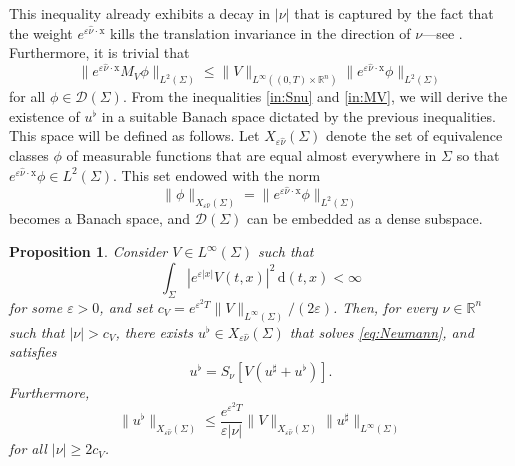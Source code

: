 \documentclass[10pt,a4paper]{amsart}
\newtheorem{proposition}{Proposition}[section]
\theoremstyle{remark}
\theoremstyle{definition}
\newcommand{\R}{\mathbb{R}}
\newcommand{\dd}{\mathrm{d}}
\newcommand{\tm}{\mathrm{t}}
\newcommand{\x}{\mathrm{x}}
\newcommand{\marnote}[1]{\marginpar{\footnotesize #1}} %
\begin{document}
This inequality already exhibits a decay in $|\nu|$ that is captured by the fact that the 
weight $e^{\varepsilon \hat{\nu} \cdot \x}$ kills the translation invariance in the direction 
of $\nu$---see .
Furthermore, it is trivial that
\begin{equation}
\label{in:MV}
\| e^{\varepsilon \hat{\nu} \cdot \x} M_V \phi \|_{L^2(\Sigma)} \leq \| V \|_{L^\infty ((0, T) \times \R^n)} \| e^{\varepsilon \hat{\nu} \cdot \x} \phi \|_{L^2(\Sigma)}
\end{equation}
for all $\phi \in \mathcal{D}(\Sigma)$.
From the inequalities \eqref{in:Snu} and \eqref{in:MV}, we will derive the existence of 
$u^\flat$ in a suitable Banach space dictated by the previous inequalities. This space will be defined as follows. Let $X_{\varepsilon\hat{\nu}}(\Sigma)$ denote 
the set of equivalence classes $\phi$ of measurable functions 
that are equal almost everywhere in $\Sigma$ so that 
$e^{\varepsilon \hat{\nu} \cdot \x} \phi \in L^2(\Sigma)$.
This set endowed with the norm
\[ \| \phi \|_{X_{\varepsilon \hat{\nu}}(\Sigma)} = \| e^{\varepsilon \hat{\nu} \cdot \x} \phi \|_{L^2(\Sigma)} \]
becomes a Banach space, and $\mathcal{D}(\Sigma)$ can be embedded as a dense 
subspace.

\begin{proposition}\label{Prop CGO1}\sl
Consider $V \in L^\infty (\Sigma) $ such that
\begin{equation*}
\int_{\Sigma} | e^{\varepsilon |x|} V(t, x) |^2 \, \dd (t, x) < \infty
\end{equation*}
for some $\varepsilon > 0$, and set
$c_V = e^{\varepsilon^2 T} \| V \|_{L^\infty (\Sigma)}/(2\varepsilon)$.
Then, for every $\nu \in \R^n$ such that $|\nu| > c_V$,
there exists $u^\flat \in X_{\varepsilon \hat{\nu}}(\Sigma)$ 
that solves \eqref{eq:Neumann}, and satisfies
\begin{equation}
\label{eq:uflat}
u^\flat = S_\nu [V(u^\sharp + u^\flat)].
\end{equation} 
Furthermore, 
\[ \| u^\flat \|_{X_{\varepsilon \hat{\nu}}(\Sigma)}
\leq \frac{e^{\varepsilon^2 T}}{ \varepsilon |\nu|} 
\| V \|_{X_{\varepsilon \hat{\nu}}(\Sigma)}
\| u^\sharp \|_{L^\infty (\Sigma)} \]
for all $|\nu| \geq 2 c_V$.
\end{proposition}
\end{document}

